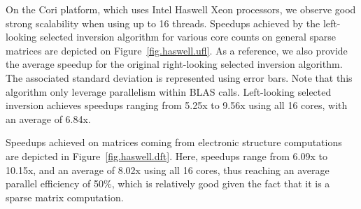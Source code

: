 \documentclass[10pt, conference, compsocconf,letterpaper,twocolumn]{IEEEtran}
\begin{document}
On the Cori platform, which uses Intel Haswell Xeon 
processors, we observe good strong scalability when
using up to 16 threads. Speedups achieved by the 
left-looking selected inversion algorithm for various
core counts on general sparse matrices are depicted on
Figure~\ref{fig.haswell.ufl}. As a reference, we also
provide the average speedup for the original right-looking
selected inversion algorithm. The associated standard
deviation is represented using error bars. Note that this 
algorithm only leverage parallelism within
BLAS calls. Left-looking selected inversion achieves
speedups ranging from 5.25x to 9.56x using all 16 cores, with an average of 6.84x. 

Speedups achieved on matrices coming from electronic 
structure computations are depicted in 
Figure~\ref{fig.haswell.dft}. Here, speedups range from
6.09x to 10.15x, and an average of 8.02x using all 16 
cores, thus reaching an average parallel efficiency of 
50\%, which is relatively good given the fact that it is a 
sparse matrix computation.
\end{document}
